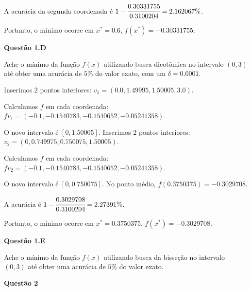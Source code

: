 \documentclass{rbfin}
\begin{document}
A acurácia da segunda coordenada é $1 - \cfrac{0.30331755}{0.3100204} = 2.162067\%$.

Portanto, o mínimo ocorre em $x^* = 0.6$, $f(x^*) = -0.30331755$.

\singlespacing

\vspace{6mm}

\large

\textbf{Questão 1.D}

\normalsize

\vspace{6mm}

\doublespacing

Ache o mínimo da função $f(x)$ utilizando busca dicotômica no intervalo $(0, 3)$ até obter uma acurácia de $5\%$ do valor exato, com um $\delta = 0.0001$.

Inserimos $2$ pontos interiores: $v_1 = (0.0, 1.49995, 1.50005, 3.0)$.

Calculamos $f$ em cada coordenada: $fv_1 = (-0.1, -0.1540783, -0.1540652, -0.05241358)$.

O novo intervalo é $[0, 1.50005]$. Inserimos $2$ pontos interiores: $v_2 = (0, 0.749975, 0.750075, 1.50005)$.

Calculamos $f$ em cada coordenada: $fv_2 = (-0.1, -0.1540783, -0.1540652, -0.05241358)$.

O novo intervalo é $[0, 0.750075]$. No ponto médio, $f(0.3750375) = -0.3029708$.

A acurácia é $1 - \cfrac{0.3029708}{0.3100204} = 2.27391\%$.

Portanto, o mínimo ocorre em $x^* = 0.3750375$, $f(x^*) = -0.3029708$.

\singlespacing

\vspace{6mm}

\large

\textbf{Questão 1.E}

\normalsize

\vspace{6mm}

\doublespacing

Ache o mínimo da função $f(x)$ utilizando busca da bisseção no intervalo $(0, 3)$ até obter uma acurácia de $5\%$ do valor exato.

\singlespacing

\vspace{6mm}

\large

\textbf{Questão 2} 
\end{document}
